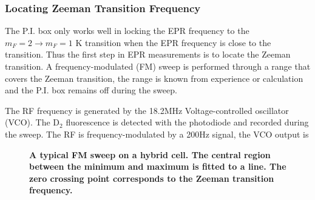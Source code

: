 \subsubsection{Locating Zeeman Transition Frequency}

The P.I. box only works well in locking the EPR frequency to the $m_{F}=2\rightarrow m_{F}=1$ K transition when the EPR frequency is close to the transition. Thus the first step in EPR measurements is to locate the Zeeman transition. A frequency-modulated (FM) sweep is performed through a range that covers the Zeeman transition, the range is known from experience or calculation and the P.I. box remains off during the sweep.

The RF frequency is generated by the 18.2MHz Voltage-controlled oscillator (VCO). The D$_{2}$ fluorescence is detected with the photodiode and recorded during the sweep. The RF is frequency-modulated by a 200Hz signal, the VCO output is 



\begin{figure}[H]
	\centering
	\caption{{\bf A typical FM sweep on a hybrid cell. The central region between the minimum and maximum is fitted to a line. The zero crossing point corresponds to the Zeeman transition frequency.}}
	\label{fmsweep}
\end{figure}




















